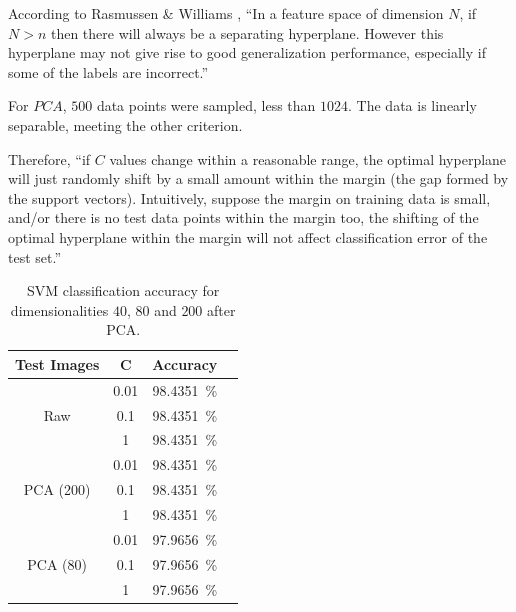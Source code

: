 \documentclass[a4paper]{exam}
\begin{document}
\begin{questions}
    According to Rasmussen \& Williams \cite{10.5555/1162254}, ``In a feature space of dimension $N$, if $N>n$ then there will always be a separating hyperplane.
    However this hyperplane may not give rise to good generalization performance, especially if some of the labels are incorrect.''

    For $PCA$, $500$ data points were sampled, less than $1024$. The data is linearly separable, meeting the other criterion.

    Therefore, ``if $C$ values change within a reasonable range, the optimal hyperplane will just randomly shift by a small amount within the margin (the gap formed by the support vectors).
    Intuitively, suppose the margin on training data is small, and/or there is no test data points within the margin too, the shifting of the optimal hyperplane within the margin will not affect classification error of the test set.''

    \begin{table}[hb]
        \centering
        \begin{tabular}{ |c|c|c|c| }
            \hline
            Test Images                  & C    & Accuracy                \\
            \hline
            \multirow{3}{4em}{Raw}       & 0.01 & \qty{98.4351}{\percent} \\
                                         & 0.1  & \qty{98.4351}{\percent} \\
                                         & 1    & \qty{98.4351}{\percent} \\
            \hline
            \multirow{3}{4em}{PCA (200)} & 0.01 & \qty{98.4351}{\percent} \\
                                         & 0.1  & \qty{98.4351}{\percent} \\
                                         & 1    & \qty{98.4351}{\percent} \\
            \hline
            \multirow{3}{4em}{PCA (80)}  & 0.01 & \qty{97.9656}{\percent} \\
                                         & 0.1  & \qty{97.9656}{\percent} \\
                                         & 1    & \qty{97.9656}{\percent} \\
            \hline
        \end{tabular}
        \caption{\label{tab:svm}SVM classification accuracy for dimensionalities $40$, $80$ and $200$ after PCA.}
    \end{table}


\end{questions}
\end{document}
